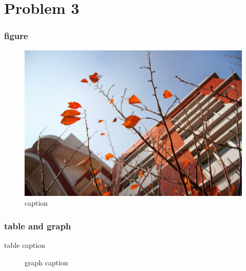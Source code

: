 \section{Problem 3}
\begin{frame}
    \frametitle{figure}
    \begin{figure}
        \centering
        \begin{stampbox}
            \includegraphics[height=0.3\textheight]{vi/plant.jpg}
        \end{stampbox}
        \caption{caption\cite{viman}}
    \end{figure}
\end{frame}

\begin{frame}
    \frametitle{table and graph}
    \begin{multicols}{2}
    \begin{table}
        \caption{table caption\cite{pgfplotstableman}}
    \end{table}
    
    \begin{figure}
        
        \caption{graph caption\cite{pgfplotsman}}
    \end{figure}
    \end{multicols}
\end{frame}
